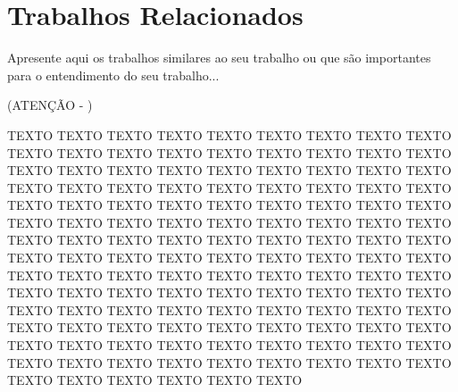 \chapter{Trabalhos Relacionados}
\label{cap:trabalhos:relacionados}

Apresente aqui os trabalhos similares ao seu trabalho ou que são importantes para o entendimento do seu trabalho...

(ATENÇÃO - )


TEXTO TEXTO TEXTO TEXTO TEXTO TEXTO TEXTO TEXTO TEXTO TEXTO TEXTO TEXTO TEXTO TEXTO TEXTO TEXTO TEXTO TEXTO TEXTO TEXTO TEXTO TEXTO TEXTO TEXTO TEXTO TEXTO TEXTO TEXTO TEXTO TEXTO TEXTO TEXTO TEXTO TEXTO TEXTO TEXTO TEXTO TEXTO TEXTO TEXTO TEXTO TEXTO TEXTO TEXTO TEXTO TEXTO TEXTO TEXTO TEXTO TEXTO TEXTO TEXTO TEXTO TEXTO TEXTO TEXTO TEXTO TEXTO TEXTO TEXTO TEXTO TEXTO TEXTO TEXTO TEXTO TEXTO TEXTO TEXTO TEXTO TEXTO TEXTO TEXTO TEXTO TEXTO TEXTO TEXTO TEXTO TEXTO TEXTO TEXTO TEXTO TEXTO TEXTO TEXTO TEXTO TEXTO TEXTO TEXTO TEXTO TEXTO TEXTO TEXTO TEXTO TEXTO TEXTO TEXTO TEXTO TEXTO TEXTO TEXTO TEXTO TEXTO TEXTO TEXTO TEXTO TEXTO TEXTO TEXTO TEXTO TEXTO TEXTO TEXTO TEXTO TEXTO TEXTO TEXTO TEXTO TEXTO TEXTO TEXTO TEXTO TEXTO TEXTO TEXTO TEXTO TEXTO TEXTO TEXTO TEXTO TEXTO TEXTO TEXTO
